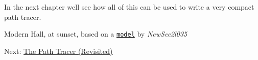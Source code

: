 \begin{DoxyParagraph}{}
In the next chapter we\textquotesingle{}ll see how all of this can be used to write a very compact path tracer.
\end{DoxyParagraph}
 \begin{DoxyParagraph}{}

\footnotesize \textquotesingle{}Modern Hall, at sunset\textquotesingle{}, based on a \href{http://www.blendswap.com/blends/view/51997}{\tt model} by {\itshape New\+See2l035}
\normalsize  ~\newline

\end{DoxyParagraph}
Next\+: \hyperlink{_p_t_page}{The Path Tracer (Revisited)} 